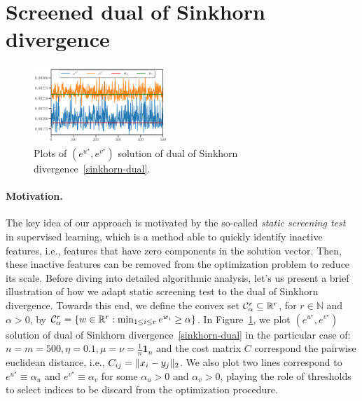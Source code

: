 
\section{Screened dual of Sinkhorn divergence} %
\label{sec:screened_dual_of_sinkhorn_divergence}

\begin{figure}
\vspace{-15pt}
\centering
\includegraphics[width=0.45\textwidth]{./figs/motivations.pdf}
\caption{Plots of $(e^{u^\star}, e^{v^\star})$ solution of dual of Sinkhorn divergence~\ref{sinkhorn-dual}.}
\label{fig:motivations}
\vspace{-11pt}
\end{figure}

\paragraph{Motivation.} 

The key idea of our approach is motivated by the so-called \emph{static screening test}~\citep{Ghaoui2010SafeFE} in supervised learning, which is a method able to quickly identify inactive features, i.e., features that have zero components in the solution vector. 
Then, these inactive features can be removed from the optimization problem to reduce its scale.
Before diving into detailed algorithmic analysis, let's us present a brief illustration of how we adapt static screening test to the dual of Sinkhorn divergence.
Towards this end, we define the convex set $\mathcal{C}^r_{\alpha} \subseteq {\mathbb{R}}^r$, for $r\in \mathbb N$ and $\alpha >0$, by $\mathcal{C}^r_{\alpha} = \{w\in {\mathbb{R}}^{r}: \min_{1\leq i\leq r} e^{w_i} \geq \alpha\}$.
In Figure~\ref{fig:motivations}, we plot $(e^{u^\star}, e^{v^\star})$ solution of dual of Sinkhorn divergence~\ref{sinkhorn-dual} in the particular case of: $n=m=500, \eta=0.1, \mu = \nu = \frac 1n \mathbf 1_n$ and the cost matrix $C$ correspond the pairwise euclidean distance, i.e., $C_{ij} = \|x_i - y_j\|_2$. 
We also plot two lines correspond to $e^{u^\star} \equiv \alpha_u$ and $e^{v^\star} \equiv \alpha_v$ for some $\alpha_u>0$ and $\alpha_v >0$, playing the role of thresholds to select indices to be discard from the optimization procedure.


